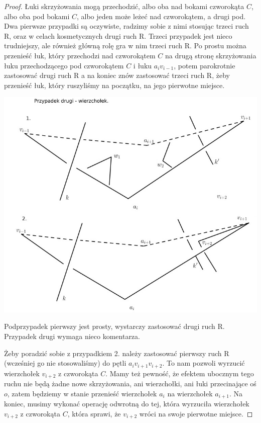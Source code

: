 \begin{proof}
Łuki skrzyżowania mogą przechodzić, albo oba nad bokami czworokąta $C$, albo oba pod bokami $C$, albo jeden może leżeć nad czworokątem, a drugi pod. Dwa pierwsze przypadki są oczywiste,
radzimy sobie z nimi stosując trzeci ruch R, oraz w celach kosmetycznych drugi ruch R. Trzeci przypadek jest nieco trudniejszy, ale również główną rolę gra w nim trzeci ruch R. Po
prostu można przenieść łuk, który przechodzi nad czworokątem $C$ na drugą stronę skrzyżowania łuku przechodzącego pod czworokątem $C$ i łuku $a_i v_{i-1}$, potem parokrotnie zastosować
drugi ruch R a na koniec znów zastosować trzeci ruch R, żeby przenieść łuk, który ruszyliśmy na początku, na jego pierwotne miejsce.


	\begin{center}

	\includegraphics[scale=0.8]{1/pictures/vertex.jpg}
	\end{center}

	
Podprzypadek pierwszy jest prosty, wystarczy zastosować drugi ruch R. Przypadek drugi wymaga nieco komentarza. 

Żeby poradzić sobie z przypadkiem 2. należy zastosować pierwszy ruch R (wcześniej go nie stosowaliśmy) do pętli $a_iv_{i+1}v_{i+2}$. To nam pozwoli wyrzucić wierzchołek $v_{i+2}$ z 
czworokąta $C$. Mamy też pewność, że efektem ubocznym tego ruchu nie będą żadne nowe skrzyżowania, ani wierzchołki, ani łuki przecinające oś $o$, zatem będziemy w stanie przenieść 
wierzchołek $a_i$ na wierzchołek $a_{i+1}$. Na koniec, musimy wykonać operację odwrotną do tej, która wyrzuciła wierzchołek $v_{i+2}$ z czworokąta $C$, która sprawi, że $v_{i+2}$
wróci na swoje pierwotne miejsce.



\end{proof}
